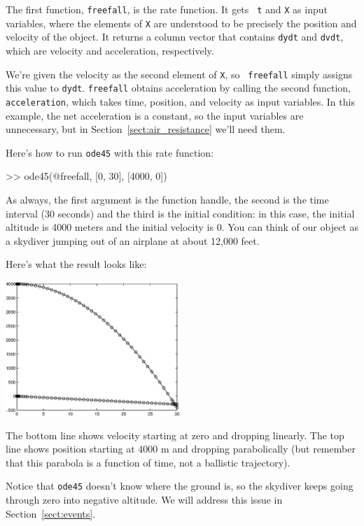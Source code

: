\documentclass[
]{book}
\numberwithin{Answer}{chapter}
\numberwithin{Exercise}{chapter}
\begin{document}
The first function, {\tt freefall}, is the rate function.  It gets {\tt
t} and {\tt X} as input variables, where the elements of {\tt X} are
understood to be precisely the position and velocity of the object.  It
returns a column vector that contains {\tt dydt} and {\tt dvdt}, which
are velocity and acceleration, respectively.

We're given the velocity as the second element of {\tt X}, so {\tt
freefall} simply assigns this value to {\tt dydt}.  {\tt freefall}
obtains acceleration by calling the second function, {\tt acceleration},
which takes time, position, and velocity as input variables.  In this
example, the net acceleration is a constant, so the input variables are
unnecessary, but in Section~\ref{sect:air_resistance} we'll need them.

Here's how to run {\tt ode45} with this rate function:

\begin{code}
>> ode45(@freefall, [0, 30], [4000, 0])
\end{code}

As always, the first argument is the function handle, the second
is the time interval (30 seconds) and the third is the initial
condition: in this case, the initial altitude is 4000 meters and
the initial velocity is 0. You can think of our object as
a skydiver jumping out of an airplane at about 12,000 feet.

Here's what the result looks like:

\beforefig \centerline{\includegraphics[height=2in]{figs/freefall.eps}}

The bottom line shows velocity starting at zero and dropping
linearly.  The top line shows position starting at 4000 m and
dropping parabolically (but remember that this parabola
is a function of time, not a ballistic trajectory).

Notice that {\tt ode45} doesn't know where the ground is, so the
skydiver keeps going through zero into negative altitude.  We will
address this issue in Section~\ref{sect:events}.
\end{document}
